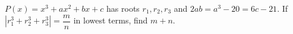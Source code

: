 $P(x)=x^3+ax^2+bx+c$ has roots $r_1,r_2,r_3$ and $2ab=a^3-20=6c-21$. If $|r_1^3+r_2^3+r_3^3|=\dfrac{m}{n}$ in lowest terms, find $m+n$.
